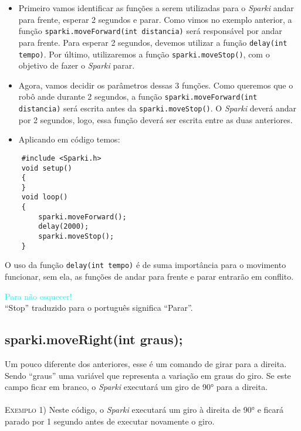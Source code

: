     \begin{itemize}
        \item Primeiro vamos identificar as funções a serem utilizadas para o \textsl{Sparki} andar para frente, esperar 2 segundos e parar. Como vimos no exemplo anterior, a função \texttt{sparki.moveForward(int distancia)} será responsável por andar para frente. Para esperar 2 segundos, devemos utilizar a função \texttt{delay(int tempo)}. Por último, utilizaremos a função \texttt{sparki.moveStop()}, com o objetivo de fazer o \textsl{Sparki} parar.
        \item Agora, vamos decidir os parâmetros dessas 3 funções. Como queremos que o robô ande durante 2 segundos, a função \texttt{sparki.moveForward(int distancia)} será escrita antes da \texttt{sparki.moveStop()}. O \textsl{Sparki} deverá andar por 2 segundos, logo, essa função deverá ser escrita entre as duas anteriores.
        \item Aplicando em código temos:
    \end{itemize}
    
    \begin{verbatim}
    #include <Sparki.h>
    void setup()
    {
    }
    void loop()
    {
        sparki.moveForward();
        delay(2000);
        sparki.moveStop();
    }
    \end{verbatim}
    
    O uso da função \texttt{delay(int tempo)} é de suma importância para o movimento funcionar, sem ela, as funções de andar para frente e parar entrarão em conflito.
    
    \begin{center}
    \textcolor{cyan}{Para não esquecer!}
    \\``Stop'' traduzido para o português significa ``Parar''.
    \end{center}
    
\subsection{sparki.moveRight(int graus);}
    Um pouco diferente dos anteriores, esse é um comando de girar para a direita. Sendo ``graus'' uma variável que representa a variação em graus do giro. Se este campo ficar em branco, o \textsl{Sparki} executará um giro de 90° para a direita.
    \\
    \\
    \textsc{Exemplo 1)} Neste código, o \textsl{Sparki} executará um giro à direita de 90° e ficará parado por 1 segundo antes de executar novamente o giro.
    
